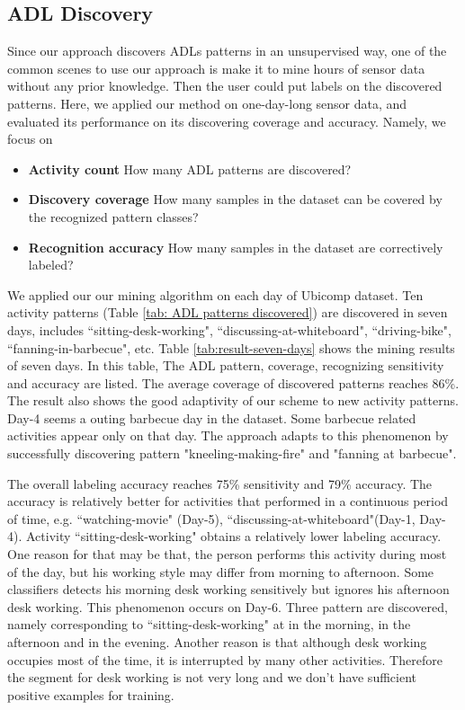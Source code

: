\documentclass{sigchi}
\begin{document}
    \subsection{ADL Discovery}
    \label{subsec.exp.mining-on-same-day}

    Since our approach discovers ADLs patterns in an unsupervised way, one of the common scenes to use our approach is make it to mine hours of sensor data without any prior knowledge. Then the user could put labels on the discovered patterns.
    Here, we applied our method on one-day-long sensor data, and evaluated its performance on its discovering coverage and accuracy.
    Namely, we focus on
        \begin{itemize}
        \item \textbf{Activity count} How many ADL patterns are discovered?
        \item \textbf{Discovery coverage} How many samples in the dataset can be covered by the recognized pattern classes?
        \item \textbf{Recognition accuracy} How many samples in the dataset are correctively labeled?
        \end{itemize}

    


     We applied our our mining algorithm on each day of Ubicomp dataset.
     Ten activity patterns (Table \ref{tab: ADL patterns discovered}) are discovered in seven days, includes ``sitting-desk-working", ``discussing-at-whiteboard", ``driving-bike", ``fanning-in-barbecue", etc.
     Table \ref{tab:result-seven-days} shows the mining results of seven days.
     In this table, The ADL pattern, coverage, recognizing sensitivity and accuracy are listed.
     The average coverage of discovered patterns reaches 86\%.
     The result also shows the good adaptivity of our scheme to new activity patterns.
     Day-4 seems a outing barbecue day in the dataset. Some barbecue related activities appear only on that day.
     The approach adapts to this phenomenon by successfully discovering pattern "kneeling-making-fire" and "fanning at barbecue".

     The overall labeling accuracy reaches 75\% sensitivity and 79\% accuracy.
     The accuracy is relatively better for activities that performed in a continuous period of time, e.g. ``watching-movie" (Day-5), ``discussing-at-whiteboard"(Day-1, Day-4).
     Activity ``sitting-desk-working" obtains a relatively lower labeling accuracy.
     One reason for that may be that, the person performs this activity during most of the day, but his working style may differ from morning to afternoon.
     Some classifiers detects his morning desk working sensitively but ignores his afternoon desk working.
     This phenomenon occurs on Day-6. Three pattern are discovered, namely corresponding to ``sitting-desk-working" at in the morning, in the afternoon and in the evening.
     Another reason is that although desk working occupies most of the time, it is interrupted by many other activities.
     Therefore the segment for desk working is not very long and we don't have sufficient positive examples for training.
\end{document}
